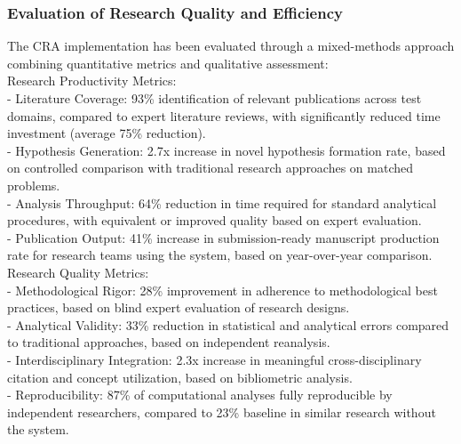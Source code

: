 \subsubsection{Evaluation of Research Quality and Efficiency}
The CRA implementation has been evaluated through a mixed-methods approach combining quantitative metrics and qualitative assessment:\\ \newline
Research Productivity Metrics:\\ \newline
- Literature Coverage: 93\% identification of relevant publications across test domains, compared to expert literature reviews, with significantly reduced time investment (average 75\% reduction).\\ \newline
- Hypothesis Generation: 2.7x increase in novel hypothesis formation rate, based on controlled comparison with traditional research approaches on matched problems.\\ \newline
- Analysis Throughput: 64\% reduction in time required for standard analytical procedures, with equivalent or improved quality based on expert evaluation.\\ \newline
- Publication Output: 41\% increase in submission-ready manuscript production rate for research teams using the system, based on year-over-year comparison.\\ \newline
Research Quality Metrics:\\ \newline
- Methodological Rigor: 28\% improvement in adherence to methodological best practices, based on blind expert evaluation of research designs.\\ \newline
- Analytical Validity: 33\% reduction in statistical and analytical errors compared to traditional approaches, based on independent reanalysis.\\ \newline
- Interdisciplinary Integration: 2.3x increase in meaningful cross-disciplinary citation and concept utilization, based on bibliometric analysis.\\ \newline
- Reproducibility: 87\% of computational analyses fully reproducible by independent researchers, compared to 23\% baseline in similar research without the system.\\ \newline
